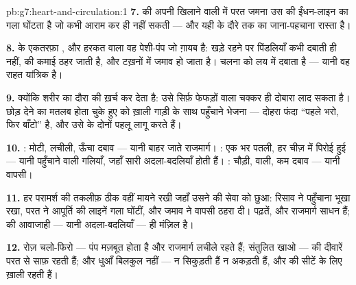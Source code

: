 \begin{solution}{pb:g7:heart-and-circulation:1}
\textbf{7.}  की अपनी खिलाने वाली  में परत जमना उस  की
ईंधन-लाइन का गला घोंटता है जो कभी आराम कर ही नहीं सकती --- और यही 
के दौरे तक का जाना-पहचाना रास्ता है।

\textbf{8.}  के एकतरफ़ा , और हरकत वाला वह पेशी-पंप जो ग़ायब
है:  खड़े रहने पर पिंडलियाँ कभी दबाती ही नहीं,  की कमाई ठहर
जाती है, और टख़नों में जमाव हो जाता है। चलना  को लय में दबाता है
--- यानी वह राहत यांत्रिक है।

\textbf{9.} क्योंकि शरीर का दौरा  की  ख़र्च कर देता है:
उसे सिर्फ़ फेफड़ों वाला चक्कर ही दोबारा लाद सकता है।  छोड़ देने का
मतलब होता चुके हुए  को ख़ाली गाड़ी के साथ पहुँचाने भेजना --- दोहरा
फंदा ``पहले भरो, फिर बाँटो'' है, और उसे  के दोनों पहलू लागू करते
हैं।

\textbf{10.} : मोटी, लचीली, ऊँचा दबाव --- यानी बाहर जाते राजमार्ग।
: एक  भर पतली, हर चीज़ में पिरोई हुई --- यानी पहुँचाने वाली
गलियाँ, जहाँ सारी अदला-बदलियाँ होती हैं। : चौड़ी,  वाली, कम
दबाव --- यानी वापसी।

\textbf{11.} हर परामर्श की तकलीफ़ ठीक वहीं मायने रखी जहाँ उसने 
की सेवा को छुआ: रिसाव ने पहुँचाना भूखा रखा, परत ने आपूर्ति की लाइनें गला
घोंटीं, और जमाव ने वापसी ठहरा दी। पढ़तें,  और राजमार्ग साधन हैं;
 की आवाजाही --- यानी अदला-बदलियाँ --- ही मंज़िल है।

\textbf{12.} रोज़ चलो-फिरो --- पंप मज़बूत होता है और राजमार्ग लचीले
रहते हैं; संतुलित खाओ ---  की दीवारें परत से साफ़ रहती हैं; और
धुआँ बिलकुल नहीं ---  न सिकुड़ती हैं न अकड़ती हैं, और  की
सीटें  के लिए ख़ाली रहती हैं।
\end{solution}
